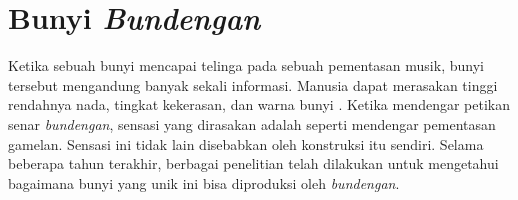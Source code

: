 

\section{Bunyi \textit{Bundengan}}
Ketika sebuah bunyi mencapai telinga pada sebuah pementasan musik, bunyi tersebut mengandung banyak sekali informasi. Manusia dapat merasakan tinggi rendahnya nada, tingkat kekerasan, dan warna bunyi \cite{meyer}. Ketika mendengar petikan senar \textit{bundengan}, sensasi yang dirasakan adalah seperti mendengar pementasan gamelan. Sensasi ini tidak lain disebabkan oleh konstruksi \bundengan itu sendiri. Selama beberapa tahun terakhir, berbagai penelitian telah dilakukan untuk mengetahui bagaimana bunyi yang unik ini bisa diproduksi oleh \textit{bundengan}. \par  

